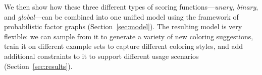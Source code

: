 We then show how these three different types of scoring functions---\emph{unary}, \emph{binary}, and \emph{global}---can be combined into one unified model using the framework of probabilistic factor graphs (Section~\ref{sec:model}). The resulting model is very flexible: we can sample from it to generate a variety of new coloring suggestions, train it on different example sets to capture different coloring styles, and add additional constraints to it to support different usage scenarios (Section~\ref{sec:results}).

%
